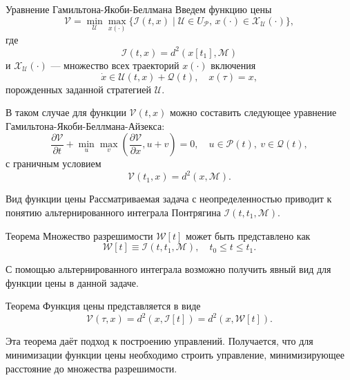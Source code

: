 \documentclass{beamer}
\begin{document}
\begin{frame}{Уравнение Гамильтона-Якоби-Беллмана}
Введем функцию цены
\begin{equation*}
    \mathcal{V} = \min_{\mathcal{U}} \max_{x(\cdot)} \{\mathcal{I}(t,x) \mid \mathcal{U} \in 
     U_{\mathcal{P}}, \, x(\cdot) \in \mathcal{X}_{\mathcal{U}}(\cdot) \},
\end{equation*}
где
\[
     \mathcal{I}(t,x) = d^2(x[t_1], \mathcal{M})
\]
и \( \mathcal{X}_{\mathcal{U}}(\cdot) \) --- множество всех траекторий \( x(\cdot) \) включения
\begin{equation*}
    \dot{x} \in \mathcal{U}(t,x) + \mathcal{Q}(t), \quad x(\tau) = x,
\end{equation*}
порожденных заданной стратегией \( \mathcal{U} \).

В таком случае для функции \( \mathcal{V}(t,x) \) можно составить следующее уравнение 
 Гамильтона-Якоби-Беллмана-Айзекса:
\begin{equation*}
    \frac{\partial \mathcal{V}}{\partial t} + \min_u \max_v \left( \frac{\partial \mathcal{V}}
     {\partial x}, u + v \right) = 0, \quad u \in \mathcal{P}(t), \ v \in \mathcal{Q}(t),
\end{equation*}
с граничным условием
\begin{equation*}
    \mathcal{V}(t_1, x) = d^2(x, \mathcal{M}).
\end{equation*}

\end{frame}

\begin{frame}{Вид функции цены}
\small
Рассматриваемая задача с неопределенностью приводит к понятию альтернированного интеграла Понтрягина \( \mathcal{I}(t, t_1, \mathcal{M}) \).

\begin{block}{Теорема}
    Множество разрешимости \( \mathcal{W}[t] \) может быть представлено как 
    \begin{equation*}
        \mathcal{W}[t] \equiv \mathcal{I}(t, t_1, \mathcal{M}), \quad t_0 \le t \le t_1.
    \end{equation*}
\end{block}

С помощью альтернированного интеграла возможно получить явный вид для функции цены в данной задаче.

\begin{block}{Теорема}
Функция цены представляется в виде
    \begin{equation*}
        \mathcal{V}(\tau, x) = d^2(x, \mathcal{I}[t]) = d^2(x, \mathcal{W}[t]).
    \end{equation*}
\end{block}

Эта теорема даёт подход к построению управлений. Получается, что для минимизации функции цены необходимо строить управление, минимизирующее расстояние до множества разрешимости.

\end{frame}
\end{document}
